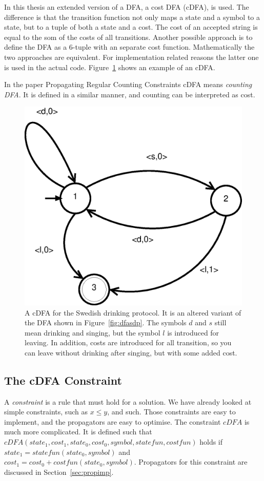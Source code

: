 \documentclass[a4paper,11pt]{article}
\begin{document}
In this thesis an extended version of a DFA, a cost DFA (cDFA), is used. The difference is that the transition function not only maps a state and a symbol to a state, but to a tuple of both a state and a cost. The cost of an accepted string is equal to the som of the costs of all transitions. Another possible approach is to define the DFA as a 6-tuple with an separate cost function. Mathematically the two approaches are equivalent. For implementation related reasons the latter one is used in the actual code. Figure~\ref{fig:cdfasdp} shows an example of an cDFA.

In the paper Propagating Regular Counting Constraints \cite{Beldiceanu675954} cDFA means \textit{counting DFA}. It is defined in a similar manner, and counting can be interpreted as cost. 

\begin{figure}[H]
\centering
\includegraphics[scale=0.6]{cdfa.eps}
\caption{A cDFA for the Swedish drinking protocol. It is an altered variant of the DFA shown in Figure~\ref{fig:dfasdp}. The symbols $d$ and $s$ still mean drinking and singing, but the symbol $l$ is introduced for leaving. In addition, costs are introduced for all transition, so you can leave without drinking after singing, but with some added cost.}
\label{fig:cdfasdp}
\end{figure}

\subsection{The cDFA Constraint}
\label{sec:cdfaconstraint}
A \textit{constraint} is a rule that must hold for a solution. We have already looked at simple constraints, such as $x\le y$, and such. Those constraints are easy to implement, and the propagators are easy to optimise. The constraint $cDFA$ is much more complicated. It is defined such that $cDFA(state_1, cost_1, state_0, cost_0, symbol, statefun, costfun)$ holds if $state_1= statefun(state_0, symbol)$ and $cost_1=cost_0+costfun(state_0, symbol)$. Propagators for this constraint are discussed in Section~\ref{sec:propimp}.
\end{document}
